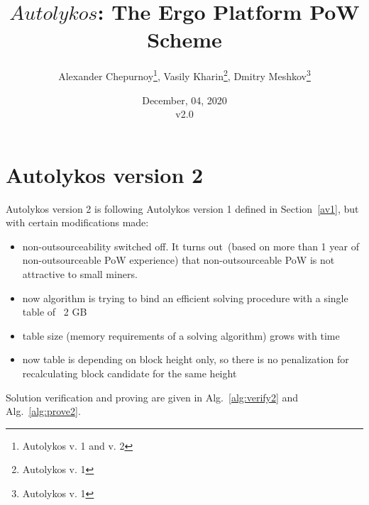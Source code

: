 \documentclass[]{article}
\newcommand{\Name}{$Autolykos$}
\begin{document}
    \title{\Name: The Ergo Platform PoW Scheme}

    \author{Alexander Chepurnoy\thanks{Autolykos v. 1 and v. 2}, Vasily Kharin\thanks{Autolykos v. 1}, Dmitry Meshkov\thanks{Autolykos v. 1}}
    \date{December, 04, 2020\\v2.0}

    \maketitle


    \section{Autolykos version 2}

    Autolykos version 2 is following Autolykos version 1 defined in Section~\ref{av1}, but with certain modifications made:
     \begin{itemize}
        \item{} non-outsourceability switched off. It turns out~(based on more than 1 year of non-outsourceable PoW experience) that non-outsourceable
                PoW is not attractive to small miners.
        \item{} now algorithm is trying to bind an efficient solving procedure with a single table of ~2 GB
        \item{} table size (memory requirements of a solving algorithm) grows with time
        \item{} now table is depending on block height only, so there is no penalization for recalculating
                block candidate for the same height
     \end{itemize}
    
    Solution verification and proving are given in Alg.~\ref{alg:verify2} and Alg.~\ref{alg:prove2}.
\end{document}
